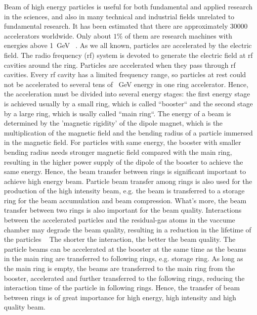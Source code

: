 %

Beam of high energy particles is useful for both fundamental and applied research in the sciences, and also in many technical and industrial fields unrelated to fundamental research. It has been estimated that there are approximately 30000 accelerators worldwide. Only about $1\%$ of them are research machines with energies above \SI{1}{GeV} ~\cite{_particle_????}.  As we all known, particles are accelerated by the electric field. The radio frequency (rf) system is devoted to generate the electric field at rf cavities around the ring. Particles are accelerated when they pass through rf cavities. Every rf cavity has a limited frequency range,  so particles at rest could not be accelerated to several tens of \SI{}{GeV} energy in one ring accelerator.  Hence, the acceleration must be divided into several energy stages: the first energy stage is achieved usually by a small ring, which is called ``booster`` and the second stage by a large ring, which is usally called ``main ring``.  The energy of a beam is determined by the 'magnetic rigidity' of the dipole magnet, which is the multiplication of the magnetic field and the bending radius of a particle immersed in the magnetic field. For particles with same energy, the booster with smaller bending radius needs stronger magnetic field compared with the main ring, resulting in the higher power supply of the dipole of the booster to achieve the same energy. Hence, the beam transfer between rings is significant important to achieve high energy beam. Particle beam transfer among rings is also used for the production of the high intensity beam, e.g. the beam is transferred to a storage ring for the beam accumulation and beam compression. What's more, the beam transfer between two rings is also important for the beam quality. Interactions between the accelerated particles and the residual-gas atoms in the vaccume chamber may degrade the beam quality, resulting in a reduction in the lifetime of the particles ~\cite{moller_beam-residual_1999} The shorter the interaction, the better the beam quality. The particle beams can be accelerated at the booster at the same time as the beams in the main ring are transferred to following rings, e.g. storage ring. As long as the main ring is empty, the beams are transferred to the main ring from the booster, accelerated and further transferred to the following rings, reducing the interaction time of the particle in following rings. Hence, the transfer of beam between rings is of great importance for high energy, high intensity and high quality beam.
